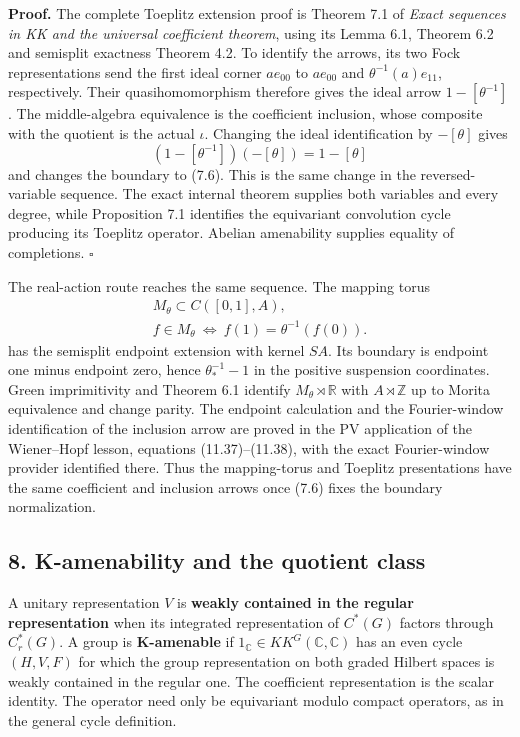 \documentclass[
  11pt,
]{article}
\begin{document}
\textbf{Proof.} The complete Toeplitz extension proof is Theorem 7.1 of
\emph{Exact sequences in KK and the universal coefficient theorem},
using its Lemma 6.1, Theorem 6.2 and semisplit exactness Theorem 4.2. To
identify the arrows, its two Fock representations send the first ideal
corner \(a e_{00}\) to \(a e_{00}\) and \(\theta^{-1}(a)e_{11}\),
respectively. Their quasihomomorphism therefore gives the ideal arrow
\(1-[\theta^{-1}]\). The middle-algebra equivalence is the coefficient
inclusion, whose composite with the quotient is the actual \(\iota\).
Changing the ideal identification by \(-[\theta]\) gives \[
(1-[\theta^{-1}])(-[\theta])=1-[\theta]
\tag{7.8}
\] and changes the boundary to (7.6). This is the same change in the
reversed-variable sequence. The exact internal theorem supplies both
variables and every degree, while Proposition 7.1 identifies the
equivariant convolution cycle producing its Toeplitz operator. Abelian
amenability supplies equality of completions. \(\square\)

The real-action route reaches the same sequence. The mapping torus \[
\begin{gathered}
M_\theta\subset C([0,1],A),\\
f\in M_\theta\ \Longleftrightarrow\ 
f(1)=\theta^{-1}(f(0)).
\end{gathered}
\tag{7.9}
\] has the semisplit endpoint extension with kernel \(SA\). Its boundary
is endpoint one minus endpoint zero, hence \(\theta_*^{-1}-1\) in the
positive suspension coordinates. Green imprimitivity and Theorem 6.1
identify \(M_\theta\rtimes\mathbb R\) with \(A\rtimes\mathbb Z\) up to
Morita equivalence and change parity. The endpoint calculation and the
Fourier-window identification of the inclusion arrow are proved in the
PV application of the Wiener--Hopf lesson, equations (11.37)--(11.38),
with the exact Fourier-window provider identified there. Thus the
mapping-torus and Toeplitz presentations have the same coefficient and
inclusion arrows once (7.6) fixes the boundary normalization.

\subsection{8. K-amenability and the quotient
class}\label{k-amenability-and-the-quotient-class}

A unitary representation \(V\) is \textbf{weakly contained in the
regular representation} when its integrated representation of \(C^*(G)\)
factors through \(C_r^*(G)\). A group is \textbf{K-amenable} if
\(1_{\mathbb C}\in KK^G(\mathbb C,\mathbb C)\) has an even cycle
\((H,V,F)\) for which the group representation on both graded Hilbert
spaces is weakly contained in the regular one. The coefficient
representation is the scalar identity. The operator need only be
equivariant modulo compact operators, as in the general cycle
definition.
\end{document}
